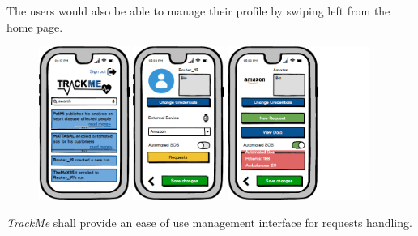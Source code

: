 \documentclass[a4paper]{article}
\begin{document}
        The users would also be able to manage their profile by swiping left from the home page.
        
        \begin{figure}[!htpb]
    	\centering
    	\includegraphics[height=50mm]{images/mockups/HomePage.png}
    	\includegraphics[height=50mm]{images/mockups/IndividualProfile.png}
    	\includegraphics[height=50mm]{images/mockups/ThirdPartyProfile.png}
        \end{figure}
        \newpage
        \textit{TrackMe} shall provide an ease of use management interface for requests handling.
\end{document}
